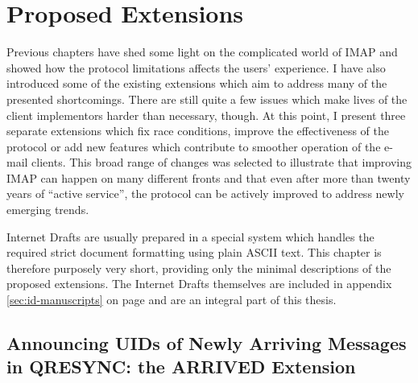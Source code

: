 \documentclass[trojita]{subfiles}
\begin{document}
\chapter{Proposed Extensions}

Previous chapters have shed some light on the complicated world of IMAP and showed how the protocol limitations affects
the users' experience.  I have also introduced some of the existing extensions which aim to address many of the
presented shortcomings.  There are still quite a few issues which make lives of the client implementors harder than
necessary, though.  At this point, I present three separate extensions which fix race conditions, improve the
effectiveness of the protocol or add new features which contribute to smoother operation of the e-mail clients.  This
broad range of changes was selected to illustrate that improving IMAP can happen on many different fronts and that even
after more than twenty years of ``active service'', the protocol can be actively improved to address newly emerging
trends.

Internet Drafts are usually prepared in a special system \cite{rfc-formatting} which handles the required strict
document formatting using plain ASCII text.  This chapter is therefore purposely very short, providing only the minimal
descriptions of the proposed extensions.  The Internet Drafts themselves are included in appendix
\ref{sec:id-manuscripts} on page \pageref{sec:id-manuscripts} and are an integral part of this thesis.

\section{Announcing UIDs of Newly Arriving Messages in QRESYNC: the ARRIVED Extension}
\label{sec:draft-arrived}
\end{document}

